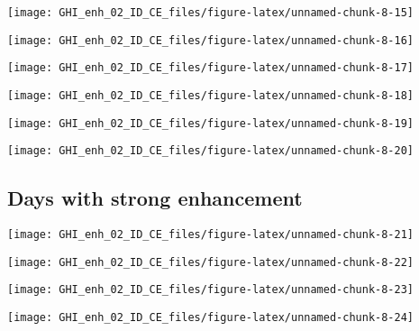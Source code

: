 \documentclass[
  10pt,
  a4paper,oneside]{article}
\begin{document}
\begin{center}\texttt{[image: GHI\_enh\_02\_ID\_CE\_files/figure-latex/unnamed-chunk-8-15]} \end{center}

\begin{center}\texttt{[image: GHI\_enh\_02\_ID\_CE\_files/figure-latex/unnamed-chunk-8-16]} \end{center}

\begin{center}\texttt{[image: GHI\_enh\_02\_ID\_CE\_files/figure-latex/unnamed-chunk-8-17]} \end{center}

\begin{center}\texttt{[image: GHI\_enh\_02\_ID\_CE\_files/figure-latex/unnamed-chunk-8-18]} \end{center}

\begin{center}\texttt{[image: GHI\_enh\_02\_ID\_CE\_files/figure-latex/unnamed-chunk-8-19]} \end{center}

\begin{center}\texttt{[image: GHI\_enh\_02\_ID\_CE\_files/figure-latex/unnamed-chunk-8-20]} \end{center}

\FloatBarrier

\hypertarget{days-with-strong-enhancement}{%
\subsection{Days with strong enhancement}\label{days-with-strong-enhancement}}

\begin{center}\texttt{[image: GHI\_enh\_02\_ID\_CE\_files/figure-latex/unnamed-chunk-8-21]} \end{center}

\begin{center}\texttt{[image: GHI\_enh\_02\_ID\_CE\_files/figure-latex/unnamed-chunk-8-22]} \end{center}

\begin{center}\texttt{[image: GHI\_enh\_02\_ID\_CE\_files/figure-latex/unnamed-chunk-8-23]} \end{center}

\begin{center}\texttt{[image: GHI\_enh\_02\_ID\_CE\_files/figure-latex/unnamed-chunk-8-24]} \end{center}
\end{document}
